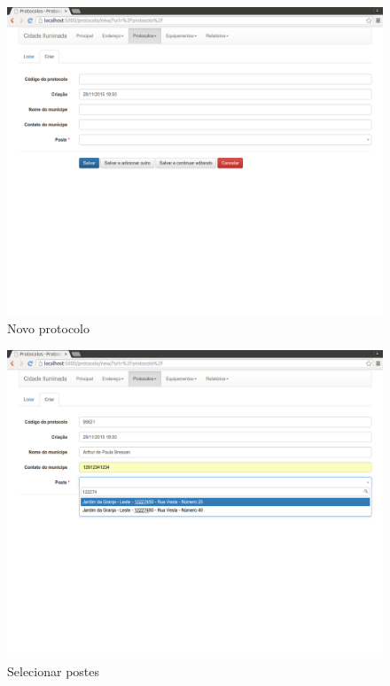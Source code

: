 \documentclass[
	article,			%
	11pt,				%
	oneside,			%
	a4paper,			%
	english,			%
	brazil,				%
	sumario=tradicional
	]{abntex2}
\begin{document}
\begin{figure}[!htbp]
 \centering
 \caption{\label{site-novo-protocolo}Novo protocolo}
 \includegraphics[scale=0.25]{site/2-novo_protocolo.png}
\end{figure}

\begin{figure}[!htbp]
 \centering
 \caption{\label{site-seleciona-poste-protocolo}Selecionar postes}
 \includegraphics[scale=0.25]{site/3-seleciona_poste.png}
\end{figure}
\end{document}
